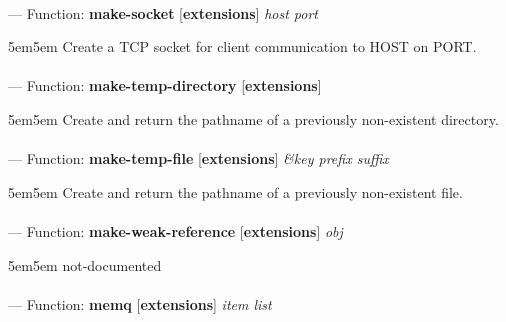 \paragraph{}
\label{EXTENSIONS:MAKE-SOCKET}
--- Function: \textbf{make-socket} [\textbf{extensions}] \textit{host port}

\begin{adjustwidth}{5em}{5em}
Create a TCP socket for client communication to HOST on PORT.
\end{adjustwidth}

\paragraph{}
\label{EXTENSIONS:MAKE-TEMP-DIRECTORY}
--- Function: \textbf{make-temp-directory} [\textbf{extensions}] \textit{}

\begin{adjustwidth}{5em}{5em}
Create and return the pathname of a previously non-existent directory.
\end{adjustwidth}

\paragraph{}
\label{EXTENSIONS:MAKE-TEMP-FILE}
--- Function: \textbf{make-temp-file} [\textbf{extensions}] \textit{\&key prefix suffix}

\begin{adjustwidth}{5em}{5em}
Create and return the pathname of a previously non-existent file.
\end{adjustwidth}

\paragraph{}
\label{EXTENSIONS:MAKE-WEAK-REFERENCE}
--- Function: \textbf{make-weak-reference} [\textbf{extensions}] \textit{obj}

\begin{adjustwidth}{5em}{5em}
not-documented
\end{adjustwidth}

\paragraph{}
\label{EXTENSIONS:MEMQ}
--- Function: \textbf{memq} [\textbf{extensions}] \textit{item list}

